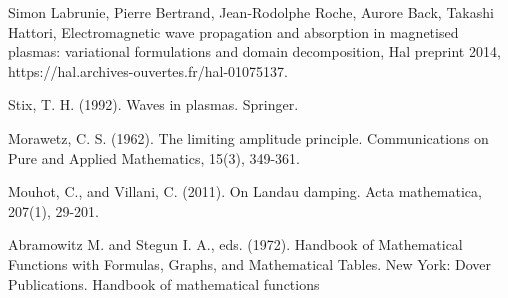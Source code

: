 \documentclass[proc]{edpsmath}
\begin{document}
\begin{thebibliography}{99}
Simon Labrunie, Pierre Bertrand, Jean-Rodolphe Roche, Aurore Back,
Takashi Hattori, 
Electromagnetic wave propagation and absorption in
magnetised plasmas: variational formulations and
domain decomposition, Hal preprint 2014, https://hal.archives-ouvertes.fr/hal-01075137.


 Stix, T. H. (1992). Waves in plasmas. Springer.

 Morawetz, C. S. (1962). The limiting amplitude principle. Communications on Pure and Applied Mathematics, 15(3), 349-361.

 Mouhot, C., and Villani, C. (2011). On Landau damping. Acta mathematica, 207(1), 29-201.

 Abramowitz M. and Stegun I. A., eds. (1972). Handbook of Mathematical Functions with Formulas, Graphs, and Mathematical Tables. New York: Dover Publications.
Handbook of mathematical functions
\end{thebibliography}
\end{document}
